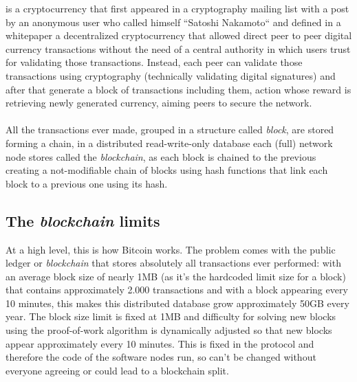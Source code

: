 \documentclass[12pt,journal,compsoc]{IEEEtran}
\begin{document}
% 
% 
% 
% 
 is a cryptocurrency that first appeared in a cryptography mailing list\cite{bitcoin-mailing-list-post:online} with a post by an anonymous user who called himself ``Satoshi Nakamoto`` and defined in a whitepaper\cite{bitcoin-whitepaper:online} a decentralized cryptocurrency that allowed direct peer to peer digital currency transactions without the need of a central authority in which users trust for validating those transactions. 
Instead, each peer can validate those transactions using cryptography (technically validating digital signatures) and after that generate a block of transactions including them, action whose reward is retrieving newly generated currency, aiming peers to secure the network. \\\\
All the transactions ever made, grouped in a structure called \textit{block}, are stored forming a chain, in a distributed read-write-only database each (full) network node stores called the \textit{blockchain}, as each block is chained to the previous creating a not-modifiable chain of blocks using hash functions that link each block to a previous one using its hash.
\subsection{The \textit{blockchain} limits}
At a high level, this is how Bitcoin works. The problem comes with the public ledger or \textit{blockchain} that stores absolutely all transactions ever performed: with an average block size of nearly 1MB\cite{blockchain-block-size:online} (as it's the hardcoded limit size for a block) that contains approximately 2.000 transactions \cite{blockchain-tx-per-block:online} and with a block appearing every 10 minutes, this makes this distributed database grow approximately 50GB every year\cite{blockchain-size:online}. The block size limit is fixed at 1MB and difficulty for solving new blocks using the proof-of-work algorithm\cite{bitcoin-wiki-proof-of-work:online} is dynamically adjusted so that new blocks appear approximately every 10 minutes. This is fixed in the protocol and therefore the code of the software nodes run, so can't be changed without everyone agreeing or could lead to a blockchain split.\\\\
\end{document}

